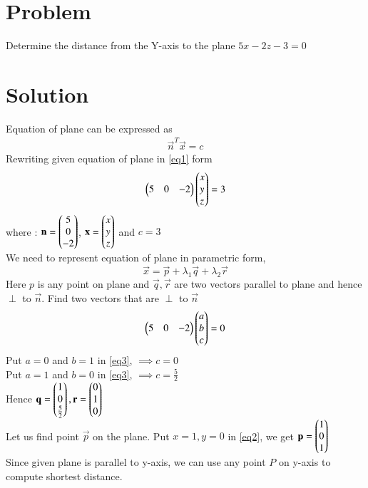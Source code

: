 \documentclass[journal,12pt,twocolumn]{IEEEtran}
\begin{document}
\section{Problem}
Determine the distance from the Y-axis to the plane $5x - 2z - 3 = 0$
\section{Solution}
Equation of plane can be expressed as 
\begin{align}\label{eq1}
	\vec{n}^T\vec{x} = c
\end{align}
Rewriting given equation of plane in \eqref{eq1} form
\begin{align}\label{eq2}
	\begin{pmatrix}5 & 0 & -2\end{pmatrix}\begin{pmatrix}x\\y\\z\end{pmatrix} = 3
\end{align}
where :
$\mathbf{n}=\begin{pmatrix}5\\0\\-2\end{pmatrix}$, $\mathbf{x} = \begin{pmatrix}x\\y\\z\end{pmatrix}$  and $c=3$\\
We need to represent equation of plane in parametric form,
\begin{equation}\label{eq3}
	\vec{x} = \vec{p} + \lambda_1\vec{q} + \lambda_2\vec{r}
\end{equation}
Here $p$ is any point on plane and $\vec{q}, \vec{r}$ are two vectors parallel to plane and hence $\perp$ to $\vec{n}$. Find two vectors that are $\perp$ to $\vec{n}$
\begin{align}\label{eq4}
	\begin{pmatrix}5 & 0 &-2\end{pmatrix}\begin{pmatrix}a\\b\\c\end{pmatrix} = 0
\end{align}
Put $a=0$ and $b=1$ in \eqref{eq3}, $\implies c=0$\\
Put $a=1$ and $b=0$ in \eqref{eq3}, $\implies c=\frac{5}{2}$\\
Hence $\mathbf{q} = \begin{pmatrix}1\\0\\\frac{5}{2}\end{pmatrix}, \mathbf{r} = \begin{pmatrix}0\\1\\0\end{pmatrix}$\\
Let us find point $\vec{p}$ on the plane. Put $x=1,y=0$ in \eqref{eq2}, we get $\mathbf{p} = \begin{pmatrix}1\\0\\1\end{pmatrix}$\\
Since given plane is parallel to y-axis, we can use any point $P$ on y-axis to compute shortest distance. 
\end{document}
